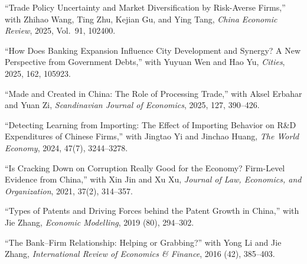 \documentclass[letterpaper]{article}
\begin{document}
\begin{papers}
\item ``Trade Policy Uncertainty and Market Diversification by Risk-Averse Firms,'' with Zhihao Wang, Ting Zhu, Kejian Gu, and Ying Tang, \textit{China Economic Review}, 2025, Vol.\ 91, 102400.

\item ``How Does Banking Expansion Influence City Development and Synergy? A New Perspective from Government Debts,'' with Yuyuan Wen and Hao Yu, \textit{Cities}, 2025, 162, 105923.

\item ``Made and Created in China: The Role of Processing Trade,'' with Aksel Erbahar and Yuan Zi, \textit{Scandinavian Journal of Economics}, 2025, 127, 390--426.

\item ``Detecting Learning from Importing: The Effect of Importing Behavior on R\&D Expenditures of Chinese Firms,'' with Jingtao Yi and Jinchao Huang, \textit{The World Economy}, 2024, 47(7), 3244--3278.

\item ``Is Cracking Down on Corruption Really Good for the Economy? Firm-Level Evidence from China,'' with Xin Jin and Xu Xu, \textit{Journal of Law, Economics, and Organization}, 2021, 37(2), 314--357.

\item ``Types of Patents and Driving Forces behind the Patent Growth in China,'' with Jie Zhang, \textit{Economic Modelling}, 2019 (80), 294--302.

\item ``The Bank--Firm Relationship: Helping or Grabbing?'' with Yong Li and Jie Zhang, \textit{International Review of Economics \& Finance}, 2016 (42), 385--403.
\end{papers}
\end{document}
